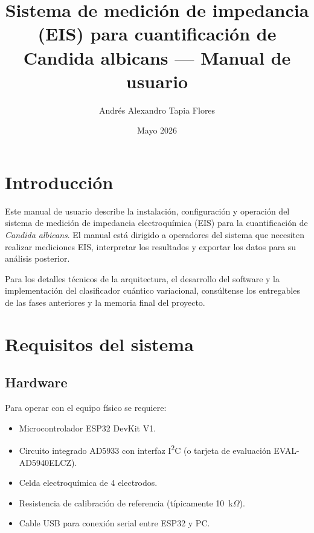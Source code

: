 \documentclass[11pt,a4paper,spanish]{book}
\title{Sistema de medici\'{o}n de impedancia (EIS) para cuantificaci\'{o}n de Candida albicans --- Manual de usuario}
\author{Andr\'{e}s Alexandro Tapia Flores}
\date{Mayo 2026}
\begin{document}
\renewcommand{\listfigurename}{\'{I}ndice de figuras}
\renewcommand{\listtablename}{\'{I}ndice de tablas}
\renewcommand{\contentsname}{\'{I}ndice de contenidos}
\renewcommand{\figurename}{Figura}
\renewcommand{\tablename}{Tabla}
\setlength{\headheight}{26pt}

\maketitle
\frontmatter
\tableofcontents
\listoffigures
\listoftables

\chapter{Introducci\'{o}n}

Este manual de usuario describe la instalaci\'{o}n, configuraci\'{o}n y operaci\'{o}n del sistema de medici\'{o}n de impedancia electroqu\'{i}mica (EIS) para la cuantificaci\'{o}n de \textit{Candida albicans}. El manual est\'{a} dirigido a operadores del sistema que necesiten realizar mediciones EIS, interpretar los resultados y exportar los datos para su an\'{a}lisis posterior.

Para los detalles t\'{e}cnicos de la arquitectura, el desarrollo del software y la implementaci\'{o}n del clasificador cu\'{a}ntico variacional, cons\'{u}ltense los entregables de las fases anteriores y la memoria final del proyecto.

\mainmatter

\chapter{Requisitos del sistema}

\section{Hardware}

Para operar con el equipo f\'{i}sico se requiere:
\begin{itemize}
	\item Microcontrolador ESP32 DevKit V1.
	\item Circuito integrado AD5933 con interfaz I\textsuperscript{2}C (o tarjeta de evaluaci\'{o}n EVAL-AD5940ELCZ).
	\item Celda electroqu\'{i}mica de 4 electrodos.
	\item Resistencia de calibraci\'{o}n de referencia (t\'{i}picamente 10~k$\Omega$).
	\item Cable USB para conexi\'{o}n serial entre ESP32 y PC.
\end{itemize}
\end{document}
